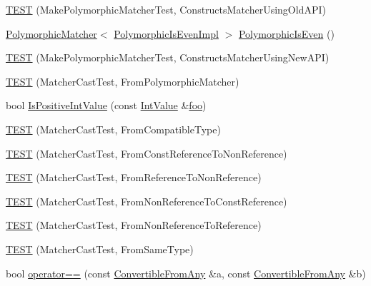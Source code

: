 \begin{DoxyCompactItemize}
\hyperlink{namespacetesting_1_1gmock__matchers__test_aad0604e47fea147ae133d134b4606a26}{T\+E\+ST} (Make\+Polymorphic\+Matcher\+Test, Constructs\+Matcher\+Using\+Old\+A\+PI)
\item 
\hyperlink{classtesting_1_1PolymorphicMatcher}{Polymorphic\+Matcher}$<$ \hyperlink{classtesting_1_1gmock__matchers__test_1_1PolymorphicIsEvenImpl}{Polymorphic\+Is\+Even\+Impl} $>$ \hyperlink{namespacetesting_1_1gmock__matchers__test_a8a0035a0de2d219d89ff7070762ece72}{Polymorphic\+Is\+Even} ()
\item 
\hyperlink{namespacetesting_1_1gmock__matchers__test_a619d872aa86419c5093327f64c466df3}{T\+E\+ST} (Make\+Polymorphic\+Matcher\+Test, Constructs\+Matcher\+Using\+New\+A\+PI)
\item 
\hyperlink{namespacetesting_1_1gmock__matchers__test_afffaa6f2c436edb7c46e7a16ed2de825}{T\+E\+ST} (Matcher\+Cast\+Test, From\+Polymorphic\+Matcher)
\item 
bool \hyperlink{namespacetesting_1_1gmock__matchers__test_a68565741c989968637db5a9e10e55020}{Is\+Positive\+Int\+Value} (const \hyperlink{classtesting_1_1gmock__matchers__test_1_1IntValue}{Int\+Value} \&\hyperlink{namespacetesting_1_1gmock__matchers__test_a3536e68112ffbb1f76887cd15bb45c15}{foo})
\item 
\hyperlink{namespacetesting_1_1gmock__matchers__test_aa7a28536a6c59d56bbbbdb4fa5ba9e4d}{T\+E\+ST} (Matcher\+Cast\+Test, From\+Compatible\+Type)
\item 
\hyperlink{namespacetesting_1_1gmock__matchers__test_a9d25aac0defd9296bf207cacd342aff0}{T\+E\+ST} (Matcher\+Cast\+Test, From\+Const\+Reference\+To\+Non\+Reference)
\item 
\hyperlink{namespacetesting_1_1gmock__matchers__test_a4bb3955a1e0b603c0156c98a2dc49eea}{T\+E\+ST} (Matcher\+Cast\+Test, From\+Reference\+To\+Non\+Reference)
\item 
\hyperlink{namespacetesting_1_1gmock__matchers__test_a6fd48b8275f96d9d4ee840f0ec590fb1}{T\+E\+ST} (Matcher\+Cast\+Test, From\+Non\+Reference\+To\+Const\+Reference)
\item 
\hyperlink{namespacetesting_1_1gmock__matchers__test_ab8d3174b8f1ab799906938ed9984643b}{T\+E\+ST} (Matcher\+Cast\+Test, From\+Non\+Reference\+To\+Reference)
\item 
\hyperlink{namespacetesting_1_1gmock__matchers__test_a8f845dd5b1bcdc660926d67dce32b5d2}{T\+E\+ST} (Matcher\+Cast\+Test, From\+Same\+Type)
\item 
bool \hyperlink{namespacetesting_1_1gmock__matchers__test_af0b7ba716a9150ff6db37abda4b44fc8}{operator==} (const \hyperlink{structtesting_1_1gmock__matchers__test_1_1ConvertibleFromAny}{Convertible\+From\+Any} \&a, const \hyperlink{structtesting_1_1gmock__matchers__test_1_1ConvertibleFromAny}{Convertible\+From\+Any} \&b)

\end{DoxyCompactItemize}
